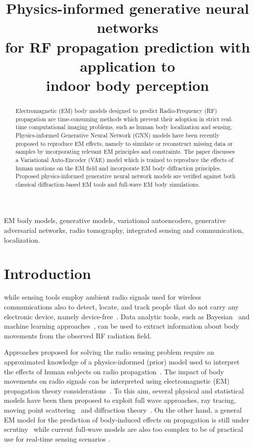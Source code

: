 
\title{Physics-informed generative neural networks  \\for RF propagation prediction with application to \\indoor body perception }
\maketitle
\begin{abstract}
Electromagnetic (EM) body models designed to predict Radio-Frequency (RF) propagation are time-consuming methods which prevent their adoption in strict real-time computational imaging problems, such as human body localization and sensing. Physics-informed Generative Neural Network (GNN) models have been recently proposed to reproduce EM effects, namely to simulate or reconstruct missing data or samples by incorporating relevant EM principles and constraints. The paper discusses a Variational Auto-Encoder (VAE) model which is trained to reproduce the effects of human motions on the EM field and incorporate EM body diffraction principles. Proposed physics-informed generative neural network models are verified against both classical diffraction-based EM tools and full-wave EM body simulations.
\end{abstract}

\begin{IEEEkeywords}
EM body models, generative models, variational autoencoders, generative adversarial networks, radio tomography, integrated sensing and communication, localization. 
\end{IEEEkeywords}


\section{Introduction}

\label{sec:intro}

 while sensing tools employ ambient radio signals used for wireless communications also to detect, locate, and track people that do not carry any electronic device, namely device-free~\cite{youssef-2007,wilson-2010,savazzi-2016}. Data analytic tools, such as Bayesian~\cite{kat} and machine learning approaches~\cite{palip}, can be used to extract information about body movements from the observed RF radiation field. 

Approaches proposed for solving the radio sensing problem require an approximated knowledge of a physics-informed (prior) model used to interpret the effects of human subjects on radio propagation~\cite{wang-2015}. The impact of body movements on radio signals can be interpreted using electromagnetic (EM) propagation theory considerations~\cite{krupka-1968}. To this aim, several physical and statistical models have been then proposed to exploit full wave approaches, ray tracing, moving point scattering~\cite{scatt} and diffraction theory~\cite{koutatis-2010,plouhinec-2019,rampa-2017,rampa-2022a}. On the other hand, a general EM model for the prediction of body-induced effects on propagation is still under scrutiny~\cite{hamilton-2014} while current full-wave models are also too complex to be of practical use for real-time sensing scenarios \cite{eleryan-2011}. 

